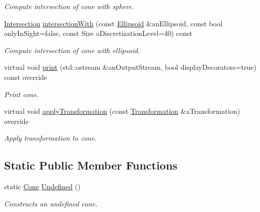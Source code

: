 \begin{DoxyCompactItemize}
\begin{DoxyCompactList}\small\item\em Compute intersection of cone with sphere. \end{DoxyCompactList}\item 
\hyperlink{classostk_1_1math_1_1geom_1_1d3_1_1_intersection}{Intersection} \hyperlink{classostk_1_1math_1_1geom_1_1d3_1_1objects_1_1_cone_acb2ad76569fdd34d460d362297956979}{intersection\+With} (const \hyperlink{classostk_1_1math_1_1geom_1_1d3_1_1objects_1_1_ellipsoid}{Ellipsoid} \&an\+Ellipsoid, const bool only\+In\+Sight=false, const Size a\+Discretization\+Level=40) const
\begin{DoxyCompactList}\small\item\em Compute intersection of cone with ellipsoid. \end{DoxyCompactList}\item 
virtual void \hyperlink{classostk_1_1math_1_1geom_1_1d3_1_1objects_1_1_cone_a511e3f582e15b11f9b571ec199fdf707}{print} (std\+::ostream \&an\+Output\+Stream, bool display\+Decorators=true) const override
\begin{DoxyCompactList}\small\item\em Print cone. \end{DoxyCompactList}\item 
virtual void \hyperlink{classostk_1_1math_1_1geom_1_1d3_1_1objects_1_1_cone_a9b783e16344d65dfba68c63d1adca3e1}{apply\+Transformation} (const \hyperlink{classostk_1_1math_1_1geom_1_1d3_1_1_transformation}{Transformation} \&a\+Transformation) override
\begin{DoxyCompactList}\small\item\em Apply transformation to cone. \end{DoxyCompactList}\end{DoxyCompactItemize}
\subsection*{Static Public Member Functions}
\begin{DoxyCompactItemize}
\item 
static \hyperlink{classostk_1_1math_1_1geom_1_1d3_1_1objects_1_1_cone}{Cone} \hyperlink{classostk_1_1math_1_1geom_1_1d3_1_1objects_1_1_cone_a06438bb2e619615fcbbce8097186edbe}{Undefined} ()
\begin{DoxyCompactList}\small\item\em Constructs an undefined cone. \end{DoxyCompactList}\end{DoxyCompactItemize}


